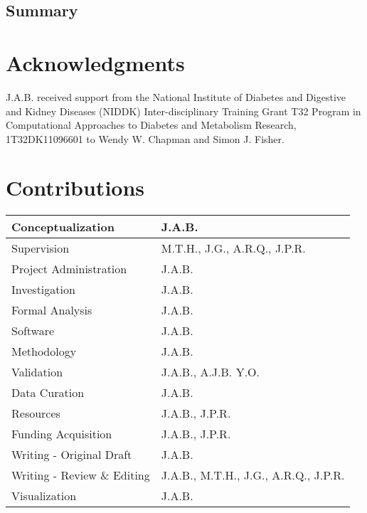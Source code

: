 \documentclass[11pt, a4paper, oneside]{article}
\begin{document}
\subsection{Summary}







\section*{Acknowledgments}
J.A.B. received support from the National Institute of Diabetes and Digestive and Kidney Diseases (NIDDK) Inter-disciplinary Training Grant T32 Program in Computational Approaches to Diabetes and Metabolism Research, 1T32DK11096601 to Wendy W. Chapman and Simon J. Fisher.


\section*{Contributions}
\begin{tabular}{ l l }
 Conceptualization & J.A.B. \\
 \hline
 Supervision & M.T.H., J.G., A.R.Q., J.P.R. \\
 \hline
 Project Administration & J.A.B. \\
 \hline
 Investigation & J.A.B. \\
 \hline
 Formal Analysis & J.A.B. \\
 \hline
 Software & J.A.B. \\
 \hline
 Methodology & J.A.B. \\
 \hline
 Validation & J.A.B., A.J.B. Y.O. \\
 \hline
 Data Curation & J.A.B. \\
 \hline
 Resources & J.A.B., J.P.R. \\
 \hline
 Funding Acquisition & J.A.B., J.P.R. \\
 \hline
 Writing - Original Draft & J.A.B. \\
 \hline
 Writing - Review \& Editing & J.A.B., M.T.H., J.G., A.R.Q., J.P.R. \\
 \hline
 Visualization & J.A.B.
\end{tabular}
\end{document}
